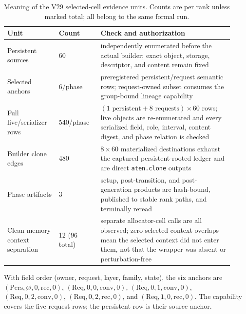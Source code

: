 \documentclass{article}
\begin{document}
\begin{table}[H]
  \caption{Meaning of the V29 selected-cell evidence units.  Counts are per
  rank unless marked total; all belong to the same formal run.}
  \label{tab:v29-evidence-units}
  \centering
  \scriptsize
  \begin{tabular}{@{}p{0.21\linewidth}p{0.17\linewidth}p{0.54\linewidth}@{}}
    \toprule
    Unit & Count & Check and authorization \\
    \midrule
    Persistent sources & 60 & independently enumerated before the actual builder; exact object, storage, descriptor, and content remain fixed \\
    Selected anchors & 6/phase & preregistered persistent/request semantic rows; request-owned subset consumes the group-bound lineage capability \\
    Full live/serializer rows & 540/phase & $(1\text{ persistent}+8\text{ requests})\times60$ rows; live objects are re-enumerated and every serialized field, role, interval, content digest, and phase relation is checked \\
    Builder clone edges & 480 & $8\times60$ materialized destinations exhaust the captured persistent-rooted ledger and are direct \texttt{aten.clone} outputs \\
    Phase artifacts & 3 & setup, post-transition, and post-generation products are hash-bound, published to stable rank paths, and terminally reread \\
    Clean-memory context separation & 12 (96 total) & separate allocator-cell calls are all observed; zero selected-context overlaps mean the selected context did not enter them, not that the wrapper was absent or perturbation-free \\
    \bottomrule
  \end{tabular}
\end{table}

With field order (owner, request, layer, family, state), the six anchors are
$(\mathrm{Pers},\varnothing,0,\mathrm{rec},0)$,
$(\mathrm{Req},0,0,\mathrm{conv},0)$,
$(\mathrm{Req},0,1,\mathrm{conv},0)$,
$(\mathrm{Req},0,2,\mathrm{conv},0)$,
$(\mathrm{Req},0,2,\mathrm{rec},0)$, and
$(\mathrm{Req},1,0,\mathrm{rec},0)$.  The capability covers the five request
rows; the persistent row is their source anchor.
\end{document}
